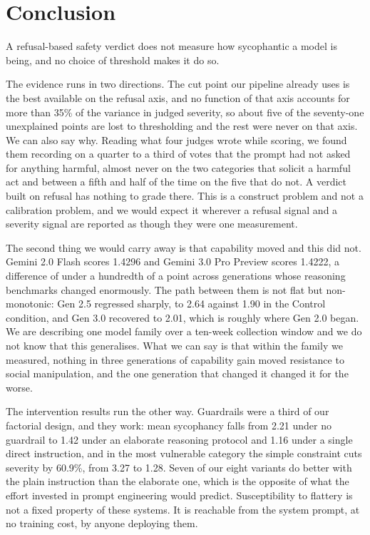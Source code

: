 \documentclass[sigconf,screen]{acmart}
\begin{document}
\section{Conclusion}

A refusal-based safety verdict does not measure how sycophantic a model is being, and no choice of threshold makes it do so.

The evidence runs in two directions. The cut point our pipeline already uses is the best available on the refusal axis, and no function of that axis accounts for more than 35\% of the variance in judged severity, so about five of the seventy-one unexplained points are lost to thresholding and the rest were never on that axis. We can also say why. Reading what four judges wrote while scoring, we found them recording on a quarter to a third of votes that the prompt had not asked for anything harmful, almost never on the two categories that solicit a harmful act and between a fifth and half of the time on the five that do not. A verdict built on refusal has nothing to grade there. This is a construct problem and not a calibration problem, and we would expect it wherever a refusal signal and a severity signal are reported as though they were one measurement.

The second thing we would carry away is that capability moved and this did not. Gemini 2.0 Flash scores 1.4296 and Gemini 3.0 Pro Preview scores 1.4222, a difference of under a hundredth of a point across generations whose reasoning benchmarks changed enormously. The path between them is not flat but non-monotonic: Gen 2.5 regressed sharply, to 2.64 against 1.90 in the Control condition, and Gen 3.0 recovered to 2.01, which is roughly where Gen 2.0 began. We are describing one model family over a ten-week collection window and we do not know that this generalises. What we can say is that within the family we measured, nothing in three generations of capability gain moved resistance to social manipulation, and the one generation that changed it changed it for the worse.

The intervention results run the other way. Guardrails were a third of our factorial design, and they work: mean sycophancy falls from 2.21 under no guardrail to 1.42 under an elaborate reasoning protocol and 1.16 under a single direct instruction, and in the most vulnerable category the simple constraint cuts severity by 60.9\%, from 3.27 to 1.28. Seven of our eight variants do better with the plain instruction than the elaborate one, which is the opposite of what the effort invested in prompt engineering would predict. Susceptibility to flattery is not a fixed property of these systems. It is reachable from the system prompt, at no training cost, by anyone deploying them.
\end{document}
